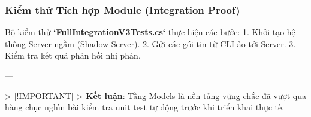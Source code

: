 \subsubsection{Kiểm thử Tích hợp Module (Integration Proof)}
Bộ kiểm thử \textbf{`FullIntegrationV3Tests.cs`} thực hiện các bước:
1.  Khởi tạo hệ thống Server ngầm (Shadow Server).
2.  Gửi các gói tin từ CLI ảo tới Server.
3.  Kiểm tra kết quả phản hồi nhị phân.

---

> [!IMPORTANT]
> \textbf{Kết luận}: Tầng Models là nền tảng vững chắc đã vượt qua hàng chục nghìn bài kiểm tra unit test tự động trước khi triển khai thực tế.

